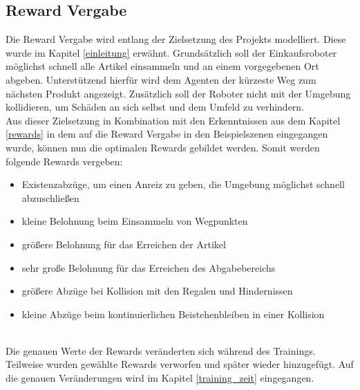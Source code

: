 \subsection{Reward Vergabe}
Die Reward Vergabe wird entlang der Zielsetzung des Projekts modelliert. Diese wurde im Kapitel \ref{einleitung} erwähnt. Grundsätzlich soll der Einkaufsroboter möglichst schnell alle Artikel einsammeln und an einem vorgegebenen Ort abgeben. Unterstützend hierfür wird dem Agenten der kürzeste Weg zum nächsten Produkt angezeigt. Zusätzlich soll der Roboter nicht mit der Umgebung kollidieren, um Schäden an sich selbst und dem Umfeld zu verhindern.
\\
Aus dieser Zielsetzung in Kombination mit den Erkenntnissen aus dem Kapitel \ref{rewards} in dem auf die Reward Vergabe in den Beispielszenen eingegangen wurde, können nun die optimalen Rewards gebildet werden. Somit werden folgende Rewards vergeben:
\\
\begin{itemize}
	\item Existenzabzüge, um einen Anreiz zu geben, die Umgebung möglichst schnell abzuschließen
	\item kleine Belohnung beim Einsammeln von Wegpunkten 
	\item größere Belohnung für das Erreichen der Artikel
	\item sehr große Belohnung für das Erreichen des Abgabebereichs
	\item größere Abzüge bei Kollision mit den Regalen und Hindernissen
	\item kleine Abzüge beim kontinuierlichen Beistehenbleiben in einer Kollision
\end{itemize}
\noindent
\\
Die genauen Werte der Rewards veränderten sich während des Trainings. Teilweise wurden gewählte Rewards verworfen und später wieder hinzugefügt. Auf die genauen Veränderungen wird im Kapitel \ref{training_zeit} eingegangen.
